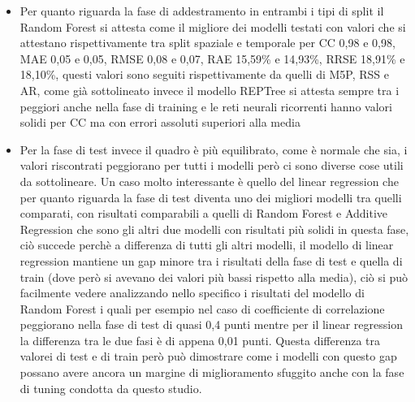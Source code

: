 \begin{itemize}
	\item Per quanto riguarda la fase di addestramento in entrambi i tipi di split il Random Forest si attesta come il migliore dei modelli testati con valori che si attestano rispettivamente tra split spaziale e temporale per CC 0,98 e 0,98, MAE 0,05 e 0,05, RMSE 0,08 e 0,07, RAE 15,59\% e 14,93\%, RRSE 18,91\% e 18,10\%, questi valori sono seguiti rispettivamente da quelli di M5P, RSS e AR, come già sottolineato invece il modello REPTree si attesta sempre tra i peggiori anche nella fase di training e le reti neurali ricorrenti hanno valori solidi per CC ma con errori assoluti superiori alla media
	\item Per la fase di test invece il quadro è più equilibrato, come è normale che sia, i valori riscontrati peggiorano per tutti i modelli però ci sono diverse cose utili da sottolineare. Un caso molto interessante è quello del linear regression che per quanto riguarda la fase di test diventa uno dei migliori modelli tra quelli comparati, con risultati comparabili a quelli di Random Forest e Additive Regression che sono gli altri due modelli con risultati più solidi in questa fase, ciò succede perchè a differenza di tutti gli altri modelli, il modello di linear regression mantiene un gap minore tra i risultati della fase di test e quella di train (dove però si avevano dei valori più bassi rispetto alla media), ciò si può facilmente vedere analizzando nello specifico i risultati del modello di Random Forest i quali per esempio nel caso di coefficiente di correlazione peggiorano nella fase di test di quasi 0,4 punti mentre per il linear regression la differenza tra le due fasi è di appena 0,01 punti. Questa differenza tra valorei di test e di train però può dimostrare come i modelli con questo gap possano avere ancora un margine di miglioramento sfuggito anche con la fase di tuning condotta da questo studio.
\end{itemize}
